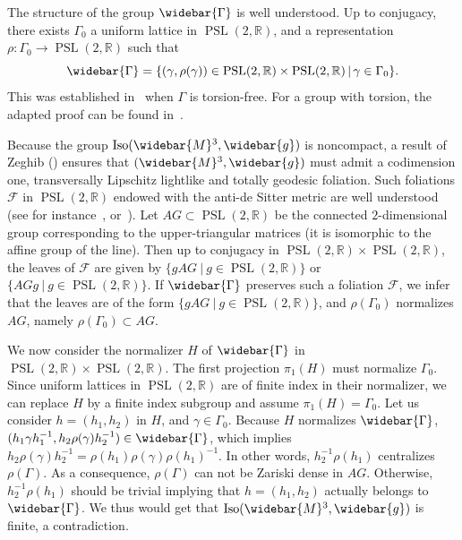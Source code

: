 \documentclass[11pt]{article}
\theoremstyle{definition}
\numberwithin{equation}{section}
\numberwithin{figure}{section}
\numberwithin{table}{section}
\DeclareMathOperator{\Iso}{Iso}
\DeclareMathOperator{\PSL}{PSL}
\newcommand*\RR{\mathbb{R}}
\let\oldbar\bar
\renewcommand*{\bar}[1]{\mathchoice{\widebar{#1}}{\widebar{#1}}{\oldbar{#1}}{\oldbar{#1}}}
\renewcommand*{\overline}{\bar}
\begin{document}
The structure of the group $\overline{\Gamma}$ is well understood. Up to conjugacy, there exists $\Gamma_0$ a uniform lattice in $\PSL(2,\RR)$, and a representation $\rho: \Gamma_0 \to \PSL(2,\RR)$ such that
\[
\overline{\Gamma}=\{ (\gamma,\rho(\gamma)) \in \PSL(2,\RR) \times \PSL(2,\RR) \, | \, \gamma \in \Gamma_0 \}.
\]
This was established in~\cite[Theorem~5.2]{kulkarni.raymond} when $\Gamma$ is torsion-free. For a group with torsion, the adapted proof can be found in~\cite[Lemma~4.3.1]{tholozan}.

Because the group $\Iso(\overline{M}^3,\overline{g})$ is noncompact, a result of Zeghib (\cite[Theorem~1.2]{zeghibisom1}) ensures that $(\overline{M}^3,\overline{g})$ must admit a codimension one, transversally Lipschitz lightlike and totally geodesic foliation. Such foliations ${\mathcal F}$ in $\PSL(2,\RR)$ endowed with the anti-de Sitter metric are well understood (see for instance~\cite[Lemme~3.3.2.9]{saleinthese}, or~\cite[Section~15.2]{zeghibisom1}). Let $AG \subset \PSL(2,\RR)$ be the connected $2$-dimensional group corresponding to the upper-triangular matrices (it is isomorphic to the affine group of the line). Then up to conjugacy in $\PSL(2,\RR) \times \PSL(2,\RR)$, the leaves of ${\mathcal F}$ are given by $\{ gAG \ | \ g \in \PSL(2,\RR)\}$ or $\{ AGg \ | \ g \in \PSL(2,\RR)\}$. If $\overline{\Gamma}$ preserves such a foliation ${\mathcal F}$, we infer that the leaves are of the form $\{ gAG \ | \ g \in \PSL(2,\RR)\}$, and $\rho(\Gamma_0)$ normalizes $AG$, namely $\rho(\Gamma_0) \subset AG$.

We now consider the normalizer $H$ of $\overline{\Gamma}$ in $\PSL(2,\RR) \times \PSL(2,\RR)$. The first projection $\pi_1(H)$ must normalize $\Gamma_0$. Since uniform lattices in $\PSL(2,\RR)$ are of finite index in their normalizer, we can replace $H$ by a finite index subgroup and assume $\pi_1(H)=\Gamma_0$. Let us consider $h=(h_1,h_2)$ in $H$, and $\gamma \in \Gamma_0$. Because $H$ normalizes $\overline{\Gamma}$, $(h_1 \gamma h_1^{-1}, h_2 \rho(\gamma)h_2^{-1}) \in \overline{\Gamma}$, which implies $h_2 \rho(\gamma)h_2^{-1}=\rho(h_1)\rho(\gamma) \rho(h_1)^{-1}$. In other words, $h_2^{-1}\rho(h_1)$ centralizes $\rho(\Gamma)$. As a consequence, $\rho(\Gamma)$ can not be Zariski dense in $AG$. Otherwise, $h_2^{-1}\rho(h_1)$ should be trivial implying that $h=(h_1,h_2)$ actually belongs to $\overline{\Gamma}$. We thus would get that $\Iso(\overline{M}^3,\overline{g})$ is finite, a contradiction.
\end{document}
